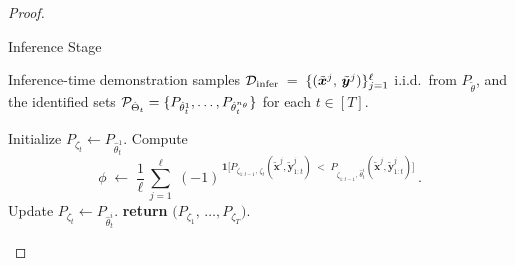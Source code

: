 \begin{proof}
\begin{algorithm}[H]
\caption{Inference Stage}
\label{alg:inference}
\begin{algorithmic}[1]
\Require Inference-time demonstration samples 
\({\mathcal{D}}_{\mathrm{infer}} \;=\; \{(\tilde{\bm x}^j,\,\tilde{\bm y}^j)\}_{j=1}^{\ell}\) 
i.i.d.\ from \(P_{\tilde{\theta}}\), 
and the identified sets
\({\mathcal{P}}_{\hat{\Theta}_t} = \{P_{\hat{\theta}_t^1}, \dots, P_{\hat{\theta}_t^{n_\theta}}\}\) 
for each \(t \in [T]\).

  \State Initialize \(P_{\zeta_t} \gets P_{\hat{\theta}_t^1}\). 
    \State Compute
      \[
      \phi 
      \;\leftarrow\; 
      \frac{1}{\ell}\,\sum_{j=1}^{\ell} 
      \;(-1)^{\,\mathbf{1}\bigl[
        P_{\zeta_{1:t-1},\,\zeta_t}(\tilde{\bm x}^j,\tilde{\bm y}^j_{1:t})
        \;<\;
        P_{\zeta_{1:t-1},\,\hat{\theta}_t^i}(\tilde{\bm x}^j,\tilde{\bm y}^j_{1:t})
      \bigr]}\,.
      \]
      \State Update \(P_{\zeta_t} \gets P_{\hat{\theta}_t^i}\).
    \EndIf
  \EndFor
\EndFor
\State \textbf{return} \(\bigl(P_{\zeta_1},\,\dots,P_{\zeta_T}\bigr)\).
\end{algorithmic}
\end{algorithm}


\end{proof}
